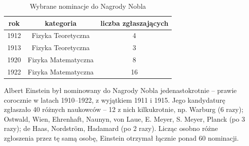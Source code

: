 \documentclass[11pt]{article}
\begin{document}
\begin{table}
\caption{Wybrane nominacje do Nagrody Nobla}
\label{tab:nagrodaNobla}
\begin{center}
\begin{tabular}{|c|c|c|}
\hline rok & kategoria & liczba zgłaszających \\ \hline\hline
1912 & Fizyka Teoretyczna & 4\\
1913 & Fizyka Teoretyczna & 3\\
1920 & Fizyka Matematyczna & 8\\
1922 & Fizyka Matematyczna & 16\\ \hline
\end{tabular}
\end{center}
\end{table}
Albert Einstein był nominowany do Nagrody Nobla jedenastokrotnie – prawie corocznie w latach 1910–1922, z wyjątkiem 1911 i 1915. Jego kandydaturę zgłaszało 40 różnych naukowców – 12 z nich kilkukrotnie, np. Warburg (6 razy); Ostwald, Wien, Ehrenhaft, Naunyn, von Laue, E. Meyer, S. Meyer, Planck (po 3 razy); de Haas, Nordström, Hadamard (po 2 razy). Licząc osobno różne zgłoszenia przez tę samą osobę, Einstein otrzymał łącznie ponad 60 nominacji\cite{Jeremy}.
\newpage
\end{document}
